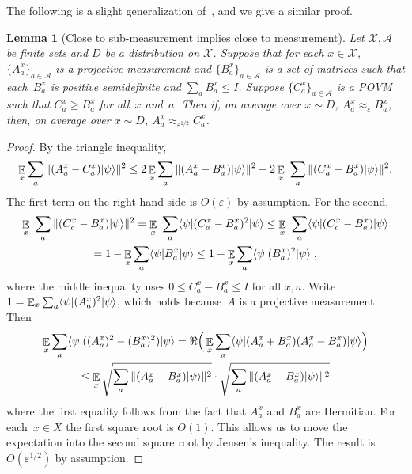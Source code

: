 \documentclass[11pt]{article}
\newtheorem{lemma}[theorem]{Lemma}
\theoremstyle{definition}
\newcommand{\ket}[1]{|#1\rangle}
\newcommand{\bra}[1]{\langle#1|}
\newcommand{\Id}{\ensuremath{I}}
\newcommand{\eps}{\varepsilon}
\newcommand{\E}{\mathop{\mathbb{E}}\displaylimits} %
\renewcommand{\cal}[1]{\mathcal{#1}}
\begin{document}
The following is a slight generalization of~\cite[Fact~4.25]{NW19},
and we give a similar proof.

\begin{lemma}[Close to sub-measurement implies close to measurement]
  \label{lem:replace-with-measurement}
  Let $\cal{X},\cal{A}$ be finite sets and $D$ be a distribution on $\cal{X}$.
  Suppose that for each $x\in \cal{X}$, $\{A^x_a\}_{a\in \cal{A}}$ is a
  projective measurement and $\{B^x_a\}_{a\in \cal{A}}$ is a set of matrices
  such that each~$B^x_a$ is positive semidefinite and $\sum_{a}B^x_a \leq \Id$.
  Suppose $\{C^x_a\}_{a \in \cal{A}}$ is a POVM such that $C^x_a \geq B^x_a$ for
  all~$x$ and~$a$.
  Then if, on average over $x\sim D$, $A^x_a \approx_{\eps} B^x_a$, then, on
  average over $x\sim D$, $A^x_a \approx_{\eps^{1/2}} C^x_a$.
\end{lemma}

\begin{proof}
  By the triangle inequality,
  \begin{equation*}
    \E_{x} \sum_a \Vert (A^{x}_a - C^{x}_a) \ket{\psi} \Vert^2
    \leq 2\E_{x} \sum_a \Vert (A^{x}_a - B^{x}_a) \ket{\psi} \Vert^2
    + 2 \E_{x}\ \sum_a \Vert (C^x_a - B^x_a) \ket{\psi}\Vert^2.
\end{equation*}
The first term on the right-hand side is $O(\eps)$ by assumption.
For the second,
\begin{multline*}
  \E_{x}\ \sum_a \Vert (C^x_a - B^x_a) \ket{\psi}\Vert^2
  = \E_{x}\ \sum_a \bra{\psi} (C^x_a - B^x_a)^2 \ket{\psi}
  \leq \E_{x}\ \sum_a \bra{\psi} (C^x_a - B^x_a) \ket{\psi}\\
  = 1- \E_{x} \sum_a\bra{\psi}  B^{x}_a \ket{\psi}
  \leq1- \E_{x} \sum_a\bra{\psi}  (B^{x}_a)^2 \ket{\psi}\;,
\end{multline*}
where the middle inequality uses $0\leq C^x_a-B^x_a\leq \Id$ for all $x,a$. 
Write $1 = \E_{x} \sum_a \bra{\psi} (A^{x}_a)^2 \ket{\psi}$, which holds
because~$A$ is a projective measurement.
Then
\begin{multline*}
  \E_{x} \sum_a \bra{\psi} ((A^{x}_a)^2  - (B^{x}_a)^2)\ket{\psi}
  = \Re\Big(\E_{x} \sum_a \bra{\psi} (A^{x}_a  + B^{x}_a)(A^{x}_a - B^{x}_a)
  \ket{\psi}\Big)\\
  \leq \E_{x} \sqrt{\sum_a \Vert (A^{x}_a + B^{x}_a) \ket{\psi}\Vert^2}
	\cdot \sqrt{\sum_a \Vert (A^{x}_a - B^{x}_a)\ket{\psi} \Vert^2}
\end{multline*}
where the first equality follows from the fact that $A^x_a$ and $B^x_a$ are
Hermitian.
For each~$x\in X$ the first square root is $O(1)$.
This allows us to move the expectation into the second square root by Jensen's
inequality.
The result is $O(\eps^{1/2})$ by assumption. 
\end{proof}
\end{document}
